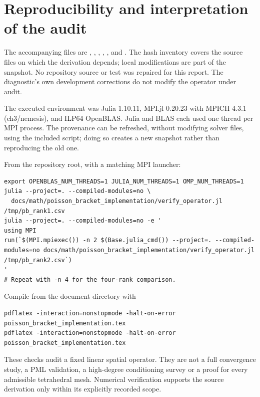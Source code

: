 \documentclass[11pt,a4paper]{article}
\begin{document}
\clearpage
\section{Reproducibility and interpretation of the audit}
The accompanying files are ,
, , ,
, and . The hash inventory covers
the source files on which the derivation depends; local modifications are
part of the snapshot. No repository source or test was repaired for this
report. The diagnostic's own development corrections do not modify the
operator under audit.

The executed environment was Julia 1.10.11, MPI.jl 0.20.23 with MPICH 4.3.1
(ch3/nemesis), and ILP64 OpenBLAS. Julia and BLAS each used one thread per
MPI process. The provenance can be refreshed, without modifying solver
files, using the included  script; doing so
creates a new snapshot rather than reproducing the old one.

From the repository root, with a matching MPI launcher:
\begin{lstlisting}
export OPENBLAS_NUM_THREADS=1 JULIA_NUM_THREADS=1 OMP_NUM_THREADS=1
julia --project=. --compiled-modules=no \
  docs/math/poisson_bracket_implementation/verify_operator.jl /tmp/pb_rank1.csv
julia --project=. --compiled-modules=no -e '
using MPI
run(`$(MPI.mpiexec()) -n 2 $(Base.julia_cmd()) --project=. --compiled-modules=no docs/math/poisson_bracket_implementation/verify_operator.jl /tmp/pb_rank2.csv`)
'
# Repeat with -n 4 for the four-rank comparison.
\end{lstlisting}
Compile from the document directory with
\begin{lstlisting}
pdflatex -interaction=nonstopmode -halt-on-error poisson_bracket_implementation.tex
pdflatex -interaction=nonstopmode -halt-on-error poisson_bracket_implementation.tex
\end{lstlisting}
These checks audit a fixed linear spatial operator. They are not a full
convergence study, a PML validation, a high-degree conditioning survey or a
proof for every admissible tetrahedral mesh. Numerical verification supports
the source derivation only within its explicitly recorded scope.
\end{document}
